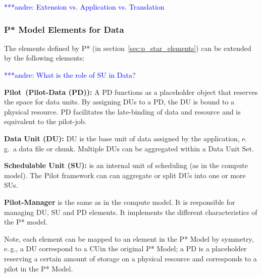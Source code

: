 \documentclass[conference,final]{IEEEtran}
\newcommand{\jhanote}[1]{ {\textcolor{red} { ***shantenu: #1 }}}
\newcommand{\alnote}[1]{ {\textcolor{blue} { ***andre: #1 }}}
\newcommand{\alnote}[1]{}
\newcommand{\jhanote}[1]{}
\newcommand{\pilot}{Pilot}
\newcommand{\cu}{CU}
\begin{document}

\alnote{Extension vs. Application vs. Translation}
\subsubsection*{P* Model Elements for Data}


The elements defined by P* (in section~\ref{sec:p_star_elements}) can
be extended by the following elements:

\alnote{What is the role of SU in Data?}
\begin{compactenum}[A.]

\item \textbf{\pilot \ (Pilot-Data  (PD)):} A PD functions as a placeholder
	  object that reserves the space for data units.  By assigning
	  DUs to a PD, the DU is bound to a physical resource.  PD
	  facilitates the late-binding of data and resource and is equivalent
	  to the pilot-job.

\item \textbf{Data Unit (DU):} DU is the base unit of data assigned by
  the application,  e.\,g.\ a data file or chunk. Multiple DUs can be aggregated 
   within a Data Unit Set.


\item \textbf{Schedulable Unit (SU):} is an internal unit of scheduling (as in 
the compute model). The Pilot framework can can aggregate or split DUs into one 
or more SUs.

\item \textbf{Pilot-Manager} is the same as in the compute model. It is
  responsible for managing DU, SU and PD elements. It implements the
  different characteristics of the P* model.
\end{compactenum}
 
Note, each element can be mapped to an element in the P* Model by
symmetry, e.\,g., a DU correspond to a \cu  in the original P* Model; 
a PD is a placeholder reserving a certain amount of storage on a physical 
resource and corresponds to a pilot in the P* Model.
\end{document}
